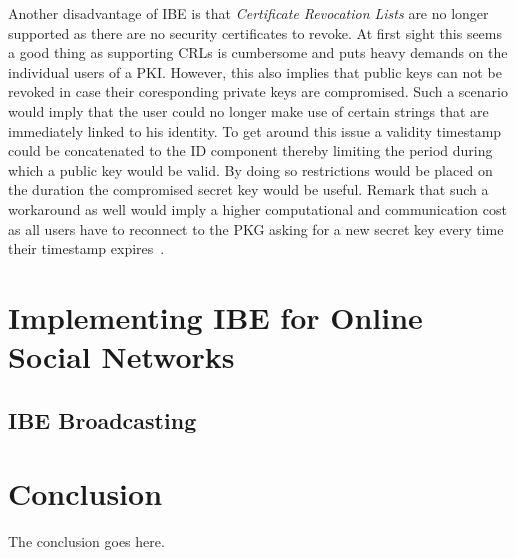 \documentclass[journal]{IEEEtran}
\begin{document}
Another disadvantage of IBE is that \textit{Certificate Revocation Lists} are
no longer supported as there are no security certificates to revoke. At first
sight this seems a good thing as supporting CRLs is cumbersome and puts heavy
demands on the individual users of a PKI. However, this also implies that
public keys can not be revoked in case their coresponding private keys are
compromised. Such a scenario would imply that the user could no longer make use
of certain strings that are immediately linked to his identity. To get around
this issue a validity timestamp could be concatenated to the ID component
thereby limiting the period during which a public key would be valid. By doing
so restrictions would be placed on the duration the compromised
secret key would be useful. Remark that such a workaround as well would imply a
higher computational and communication cost as all users have to reconnect to
the PKG asking for a new secret key every time their timestamp
expires~\cite{YoungbloodIntroduction}.

\section{Implementing IBE for Online Social Networks}

\subsection{IBE Broadcasting}

\subsection{}

\section{Conclusion}
The conclusion goes here.

%
\end{document}
